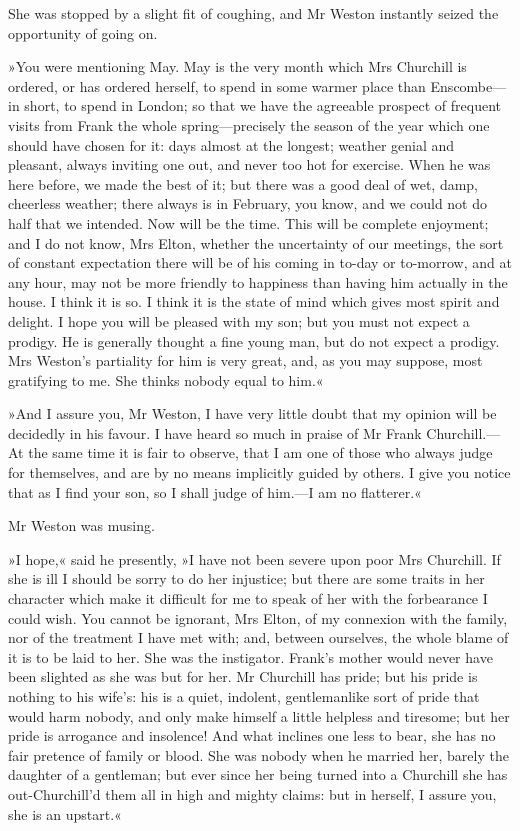 She was stopped by a slight fit of coughing, and Mr Weston instantly seized the opportunity of going on.

»You were mentioning May. May is the very month which Mrs Churchill is ordered, or has ordered herself, to spend in some warmer place than Enscombe—in short, to spend in London; so that we have the agreeable prospect of frequent visits from Frank the whole spring—precisely the season of the year which one should have chosen for it: days almost at the longest; weather genial and pleasant, always inviting one out, and never too hot for exercise. When he was here before, we made the best of it; but there was a good deal of wet, damp, cheerless weather; there always is in February, you know, and we could not do half that we intended. Now will be the time. This will be complete enjoyment; and I do not know, Mrs Elton, whether the uncertainty of our meetings, the sort of constant expectation there will be of his coming in to-day or to-morrow, and at any hour, may not be more friendly to happiness than having him actually in the house. I think it is so. I think it is the state of mind which gives most spirit and delight. I hope you will be pleased with my son; but you must not expect a prodigy. He is generally thought a fine young man, but do not expect a prodigy. Mrs Weston's partiality for him is very great, and, as you may suppose, most gratifying to me. She thinks nobody equal to him.«

»And I assure you, Mr Weston, I have very little doubt that my opinion will be decidedly in his favour. I have heard so much in praise of Mr Frank Churchill.—At the same time it is fair to observe, that I am one of those who always judge for themselves, and are by no means implicitly guided by others. I give you notice that as I find your son, so I shall judge of him.—I am no flatterer.«

Mr Weston was musing.

»I hope,« said he presently, »I have not been severe upon poor Mrs Churchill. If she is ill I should be sorry to do her injustice; but there are some traits in her character which make it difficult for me to speak of her with the forbearance I could wish. You cannot be ignorant, Mrs Elton, of my connexion with the family, nor of the treatment I have met with; and, between ourselves, the whole blame of it is to be laid to her. She was the instigator. Frank's mother would never have been slighted as she was but for her. Mr Churchill has pride; but his pride is nothing to his wife's: his is a quiet, indolent, gentlemanlike sort of pride that would harm nobody, and only make himself a little helpless and tiresome; but her pride is arrogance and insolence! And what inclines one less to bear, she has no fair pretence of family or blood. She was nobody when he married her, barely the daughter of a gentleman; but ever since her being turned into a Churchill she has out-Churchill'd them all in high and mighty claims: but in herself, I assure you, she is an upstart.«

